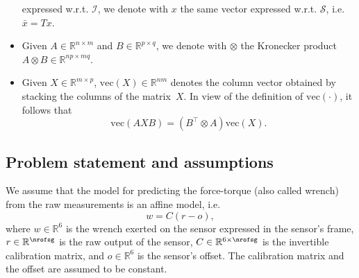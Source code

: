 \begin{itemize}
expressed w.r.t. $\mathcal{I}$, we denote with $x$ the same vector expressed w.r.t. $\mathcal{S}$, i.e. $\bar{x} = Tx$.
\item Given $A \in \mathbb{R}^{n \times m}$ and $B \in \mathbb{R}^{p \times q}$, we denote with $\otimes$ the Kronecker product $A \otimes B \in \mathbb{R}^{np \times mq}$.
\item Given $X \in \mathbb{R}^{m \times p}$, $\text{vec}(X) \in \mathbb{R}^{nm}$ denotes the column vector obtained by stacking the columns of the matrix~$X$. 
In view of the definition of $\text{vec}(\cdot)$, it follows that \begin{equation}\label{eq:kroneckerVec} \text{vec}(AXB) = \left( B^{\top} \otimes A \right) \text{vec}(X).\end{equation}

\end{itemize}

\subsection{Problem statement and assumptions}
We assume that the model for predicting the force-torque (also called wrench)  
from the raw measurements is an affine model, i.e. 
\begin{equation}
\label{wrenchInSensorCoordinates}
w =  C ( r - o),
\end{equation} 
where
$ {w} \in \mathbb{R}^{6}$ is the wrench exerted on the sensor expressed in the sensor's frame,
$r \in \mathbb{R}^{\nrofsg}$ is the raw output of the sensor,
$ {C} \in \mathbb{R}^{6 \times \nrofsg}$ is the
invertible
calibration matrix, and
${o} \in \mathbb{R}^6$ is the sensor's offset.
The calibration matrix and the offset are assumed to be constant.

